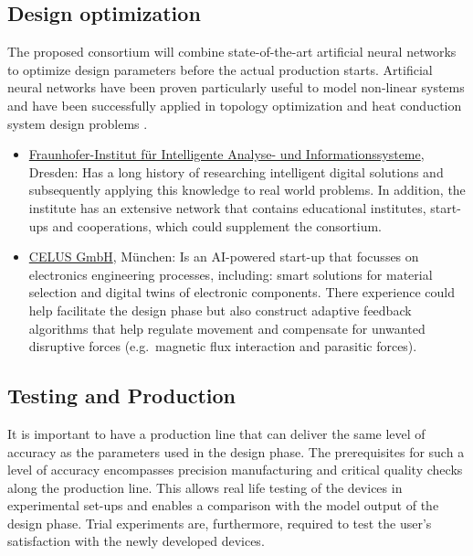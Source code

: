 \documentclass[
  oneside]{book}
\begin{document}
\hypertarget{design-optimization}{%
\subsection{Design optimization}\label{design-optimization}}

The proposed consortium will combine state-of-the-art artificial neural networks to optimize design parameters before the actual production starts. Artificial neural networks have been proven particularly useful to model non-linear systems and have been successfully applied in topology optimization and heat conduction system design problems \citep{zhang2021}.

\begin{itemize}
\item
  \href{https://www.iais.fraunhofer.de/}{Fraunhofer-Institut für Intelligente Analyse- und Informationssysteme}, Dresden: Has a long history of researching intelligent digital solutions and subsequently applying this knowledge to real world problems. In addition, the institute has an extensive network that contains educational institutes, start-ups and cooperations, which could supplement the consortium.
\item
  \href{https://www.celus.io/}{CELUS GmbH}, München: Is an AI-powered start-up that focusses on electronics engineering processes, including: smart solutions for material selection and digital twins of electronic components. There experience could help facilitate the design phase but also construct adaptive feedback algorithms that help regulate movement and compensate for unwanted disruptive forces (e.g.~magnetic flux interaction and parasitic forces).
\end{itemize}

\hypertarget{testing-and-production}{%
\subsection{Testing and Production}\label{testing-and-production}}

It is important to have a production line that can deliver the same level of accuracy as the parameters used in the design phase. The prerequisites for such a level of accuracy encompasses precision manufacturing and critical quality checks along the production line. This allows real life testing of the devices in experimental set-ups and enables a comparison with the model output of the design phase. Trial experiments are, furthermore, required to test the user's satisfaction with the newly developed devices.
\end{document}
